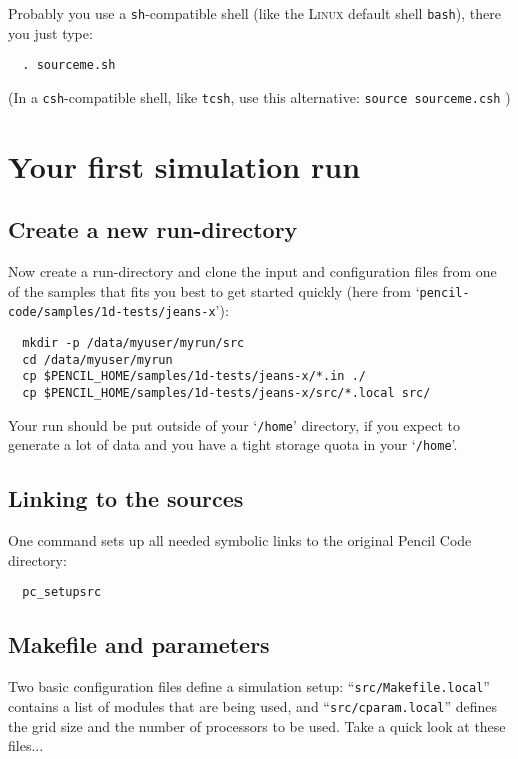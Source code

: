 \documentclass[a4paper,12pt]{article}
\newcommand{\command}[1]{\texttt{#1}}
\newcommand{\file}[1]{``\texttt{#1}''}
\newcommand{\directory}[1]{`\texttt{#1}'}
\newcommand{\name}[1]{\textsc{#1}}
\begin{document}
Probably you use a \command{sh}-compatible shell (like the \name{Linux} default shell \command{bash}), there you just type:
\begin{verbatim}
  . sourceme.sh
\end{verbatim}

(In a \command{csh}-compatible shell, like \command{tcsh}, use this alternative: \command{source sourceme.csh} )


\section{Your first simulation run}

\subsection{Create a new run-directory}

Now create a run-directory and clone the input and configuration files from one of the samples that fits you best to get started quickly (here from \directory{pencil-code/samples/1d-tests/jeans-x}):
\begin{verbatim}
  mkdir -p /data/myuser/myrun/src
  cd /data/myuser/myrun
  cp $PENCIL_HOME/samples/1d-tests/jeans-x/*.in ./
  cp $PENCIL_HOME/samples/1d-tests/jeans-x/src/*.local src/
\end{verbatim}
Your run should be put outside of your \directory{/home} directory, if you expect to generate a lot of data and you have a tight storage quota in your \directory{/home}.

\subsection{Linking to the sources}

One command sets up all needed symbolic links to the original Pencil Code directory:
\begin{verbatim}
  pc_setupsrc
\end{verbatim}

\subsection{Makefile and parameters}

Two basic configuration files define a simulation setup: \file{src/Makefile.local} contains a list of modules that are being used, and \file{src/cparam.local} defines the grid size and the number of processors to be used.
Take a quick look at these files...
\end{document}
